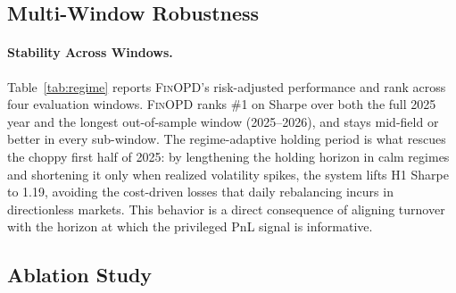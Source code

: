 \subsection{Multi-Window Robustness}



\paragraph{Stability Across Windows.} Table~\ref{tab:regime} reports \textsc{FinOPD}'s risk-adjusted performance and rank across four evaluation windows. \textsc{FinOPD} ranks \#1 on Sharpe over both the full 2025 year and the longest out-of-sample window (2025--2026), and stays mid-field or better in every sub-window. The regime-adaptive holding period is what rescues the choppy first half of 2025: by lengthening the holding horizon in calm regimes and shortening it only when realized volatility spikes, the system lifts H1 Sharpe to 1.19, avoiding the cost-driven losses that daily rebalancing incurs in directionless markets. This behavior is a direct consequence of aligning turnover with the horizon at which the privileged PnL signal is informative.

\subsection{Ablation Study}



